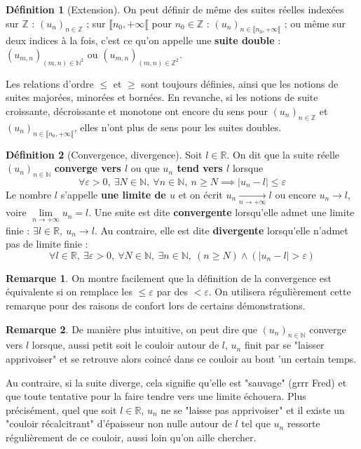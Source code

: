 \documentclass[french]{book}
\newcommand{\N}{\mathbb{N}}
\newcommand{\Z}{\mathbb{Z}}
\newcommand{\R}{\mathbb{R}}
\theoremstyle{plain}
\theoremstyle{definition}
\newtheorem{dfn}{Définition}[chapter]
\newtheorem{rmq}{Remarque}[chapter]
\theoremstyle{remark}
\begin{document}
\begin{dfn}[Extension]
	On peut définir de même des suites réelles indexées sur $\Z$ : $(u_n)_{n\in\Z}$ ; sur $\llbracket n_0,+\infty\llbracket$ pour $n_0\in\Z$ : $(u_n)_{n\in \llbracket n_0,+\infty\llbracket}$ ; ou même sur deux indices à la fois, c'est ce qu'on appelle une \textbf{suite double} : $(u_{m,n})_{(m,n)\in\N^2}$ ou $(u_{m,n})_{(m,n)\in\Z^2}$. \par Les relations d'ordre $\leqslant$ et $\geqslant$ sont toujours définies, ainsi que les notions de suites majorées, minorées et bornées. En revanche, si les notions de suite croissante, décroissante et monotone ont encore du sens pour $(u_n)_{n\in\Z}$ et $(u_n)_{n\in \llbracket n_0,+\infty\llbracket}$, elles n'ont plus de sens pour les suites doubles.
\end{dfn}
\begin{dfn}[Convergence, divergence]
	Soit $l\in\R$. On dit que la suite réelle $(u_n)_{n\in\N}$ \textbf{converge vers $l$} ou que \textbf{$u_n$ tend vers $l$} lorsque $$\forall\varepsilon>0,\ \exists N\in\N,\ \forall n\in\N,\ n\geqslant N\implies \lvert u_n-l\rvert\leqslant\varepsilon$$ Le nombre $l$ s'appelle \textbf{une limite de $u$} et on écrit $u_n\xrightarrow[n\to+\infty]{}l$ ou encore $u_n\rightarrow l$, voire $\displaystyle \underset{n\to+\infty}{\lim}u_n=l$. Une suite est dite \textbf{convergente} lorsqu'elle admet une limite finie : $\exists l\in\R,\ u_n\rightarrow l$. Au contraire, elle est dite \textbf{divergente} lorsqu'elle n'admet pas de limite finie :$$\forall l\in\R,\ \exists\varepsilon>0,\ \forall N\in\N,\ \exists n\in\N,\ (n\geqslant N)\land(\lvert u_n-l\rvert>\varepsilon)$$
\end{dfn}
\begin{rmq}
	On montre facilement que la définition de la convergence est équivalente si on remplace les $\leqslant\varepsilon$ par des $<\varepsilon$. On utilisera régulièrement cette remarque pour des raisons de confort lors de certains démonstrations.
\end{rmq}
\begin{rmq}
	De manière plus intuitive, on peut dire que $(u_n)_{n\in\N}$ converge vers $l$ lorsque, aussi petit soit le couloir autour de $l$, $u_n$ finit par se "laisser apprivoiser" et se retrouve alors coincé dans ce couloir au bout 'un certain temps. \par Au contraire, si la suite diverge, cela signifie qu'elle est "sauvage" (grrr Fred) et que toute tentative pour la faire tendre vers une limite échouera. Plus précisément, quel que soit $l\in\R$, $u_n$ ne se "laisse pas apprivoiser" et il existe un "couloir récalcitrant" d'épaisseur non nulle autour de $l$ tel que $u_n$ ressorte régulièrement de ce couloir, aussi loin qu'on aille chercher.
\end{rmq}
\end{document}
